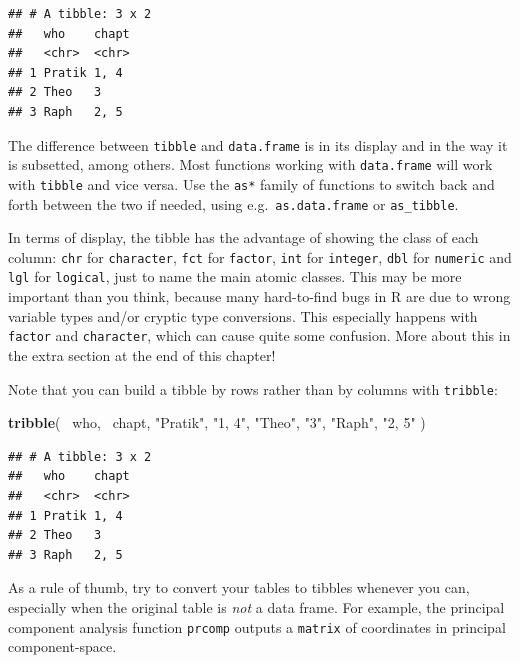 \documentclass[]{book}
\newenvironment{Shaded}{}{}
\newcommand{\KeywordTok}[1]{\textcolor[rgb]{0.00,0.44,0.13}{\textbf{#1}}}
\newcommand{\NormalTok}[1]{#1}
\newcommand{\OperatorTok}[1]{\textcolor[rgb]{0.40,0.40,0.40}{#1}}
\newcommand{\StringTok}[1]{\textcolor[rgb]{0.25,0.44,0.63}{#1}}
\begin{document}
\begin{verbatim}
## # A tibble: 3 x 2
##   who    chapt
##   <chr>  <chr>
## 1 Pratik 1, 4 
## 2 Theo   3    
## 3 Raph   2, 5
\end{verbatim}

The difference between \texttt{tibble} and \texttt{data.frame} is in its display and in the way it is subsetted, among others. Most functions working with \texttt{data.frame} will work with \texttt{tibble} and vice versa. Use the \texttt{as*} family of functions to switch back and forth between the two if needed, using e.g.~\texttt{as.data.frame} or \texttt{as\_tibble}.

In terms of display, the tibble has the advantage of showing the class of each column: \texttt{chr} for \texttt{character}, \texttt{fct} for \texttt{factor}, \texttt{int} for \texttt{integer}, \texttt{dbl} for \texttt{numeric} and \texttt{lgl} for \texttt{logical}, just to name the main atomic classes. This may be more important than you think, because many hard-to-find bugs in R are due to wrong variable types and/or cryptic type conversions. This especially happens with \texttt{factor} and \texttt{character}, which can cause quite some confusion. More about this in the extra section at the end of this chapter!

Note that you can build a tibble by rows rather than by columns with \texttt{tribble}:

\begin{Shaded}
\begin{Highlighting}[]
\KeywordTok{tribble}\NormalTok{(}
  \OperatorTok{~}\NormalTok{who, }\OperatorTok{~}\NormalTok{chapt,}
  \StringTok{"Pratik"}\NormalTok{, }\StringTok{"1, 4"}\NormalTok{,}
  \StringTok{"Theo"}\NormalTok{, }\StringTok{"3"}\NormalTok{,}
  \StringTok{"Raph"}\NormalTok{, }\StringTok{"2, 5"}
\NormalTok{)}
\end{Highlighting}
\end{Shaded}

\begin{verbatim}
## # A tibble: 3 x 2
##   who    chapt
##   <chr>  <chr>
## 1 Pratik 1, 4 
## 2 Theo   3    
## 3 Raph   2, 5
\end{verbatim}

As a rule of thumb, try to convert your tables to tibbles whenever you can, especially when the original table is \emph{not} a data frame. For example, the principal component analysis function \texttt{prcomp} outputs a \texttt{matrix} of coordinates in principal component-space.
\end{document}
